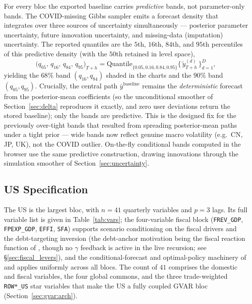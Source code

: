 \documentclass[11pt]{article}
\theoremstyle{definition}
\theoremstyle{remark}
\begin{document}
For every bloc the exported baseline carries \emph{predictive} bands,
not parameter-only bands. The COVID-missing Gibbs sampler emits a
forecast density that integrates over three sources of uncertainty
simultaneously --- posterior parameter uncertainty, future innovation
uncertainty, and missing-data (imputation) uncertainty. The reported
quantiles are the $5$th, $16$th, $84$th, and $95$th percentiles of this
predictive density (with the $50$th retained in level space),
\begin{equation}\label{eq:bands}
  \bigl(q_{05},\,q_{16},\,q_{84},\,q_{95}\bigr)_{T+h}
  = \mathrm{Quantile}_{\{0.05,0.16,0.84,0.95\}}
    \bigl\{\, \tilde{y}^{(d)}_{T+h} \,\bigr\}_{d=1}^{D},
\end{equation}
yielding the $68\%$ band $(q_{16},q_{84})$ shaded in the charts and the
$90\%$ band $(q_{05},q_{95})$. Crucially, the central path
$\bar{y}^{\text{baseline}}$ remains the \emph{deterministic} forecast
from the posterior-mean coefficients (so the unconditional smoother of
Section~\ref{sec:delta} reproduces it exactly, and zero user deviations
return the stored baseline); only the bands are predictive. This is the
designed fix for the previously over-tight bands that resulted from
spreading posterior-mean paths under a tight prior --- wide bands now
reflect genuine macro volatility (e.g.\ CN, JP, UK), not the COVID
outlier. On-the-fly conditional bands computed in the browser use the
same predictive construction, drawing innovations through the simulation
smoother of Section~\ref{sec:uncertainty}.

\subsection{US Specification}\label{sec:us-spec}

The US is the largest bloc, with $n=41$ quarterly variables and $p=3$ lags.
Its full variable list is given in Table~\ref{tab:vars}; the four-variable
fiscal block (\texttt{FREV\_GDP}, \texttt{FPEXP\_GDP}, \texttt{EFFI},
\texttt{SFA}) supports scenario conditioning on the fiscal drivers and the
debt-targeting inversion (the debt-anchor motivation being the fiscal
reaction function of \citealp{Bohn1998}, though no $\gamma$ feedback is
active in the live recursion; see \S\ref{sec:fiscal_levers}), and the
conditional-forecast and optimal-policy machinery of
\citet{BanburaGiannoneLenza2015} and \citet{BarnichonMesters2023}
applies uniformly across all blocs. The count of $41$ comprises the domestic and
fiscal variables, the four global commons, and the three trade-weighted
\texttt{ROW*\_US} star variables that make the US a fully coupled GVAR bloc
(Section~\ref{sec:gvar:arch}).
\end{document}
